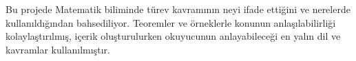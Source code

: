 Bu projede Matematik biliminde türev kavramının neyi ifade ettiğini ve nerelerde kullanıldığından bahsediliyor. Teoremler ve örneklerle konunun anlaşılabilirliği kolaylaştırılmış, içerik oluşturulurken okuyucunun anlayabileceği en yalın dil ve kavramlar kullanılmıştır. 